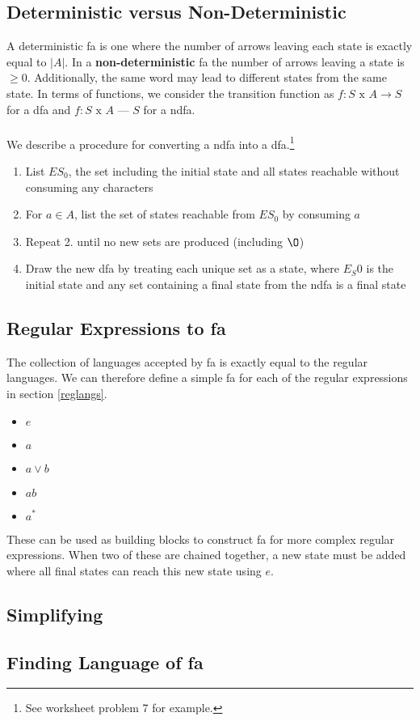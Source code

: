 \documentclass{article}
\begin{document}
		\subsection{Deterministic versus Non-Deterministic}
			A deterministic fa is one where the number of arrows leaving each state is exactly equal to $|A|$. In a \textbf{non-deterministic} fa the number of arrows leaving a state is $\geq 0$. Additionally, the same word may lead to different states from the same state. In terms of functions, we consider the transition function as $f : S \text{ x } A \rightarrow S$ for a dfa and $f : S \text{ x } A$ ---  $S$ for a ndfa.
			\\\\ We describe a procedure for converting a ndfa into a dfa.\footnote{See worksheet problem 7 for example.}
			\begin{enumerate}
				\item List $ES_0$, the set including the initial state and all states reachable without consuming any characters
				\item For $a \in A$, list the set of states reachable from $ES_0$ by consuming $a$
				\item Repeat 2. until no new sets are produced (including $\O$)
				\item Draw the new dfa by treating each unique set as a state, where $E_S0$ is the initial state and any set containing a final state from the ndfa is a final state
			\end{enumerate}
		\subsection{Regular Expressions to fa}
			The collection of languages accepted by fa is exactly equal to the regular languages. We can therefore define a simple fa for each of the regular expressions in section \ref{reglangs}. \\
			\begin{itemize}
				\item $e$ \\
				\item $a$
				\item $a \lor b$
				\item $ab$
				\item $a^*$
			\end{itemize}
			These can be used as building blocks to construct fa for more complex regular expressions. When two of these are chained together, a new state must be added where all final states can reach this new state using $e$.
		\subsection{Simplifying}
		
		\subsection{Finding Language of fa}
	
\end{document}
